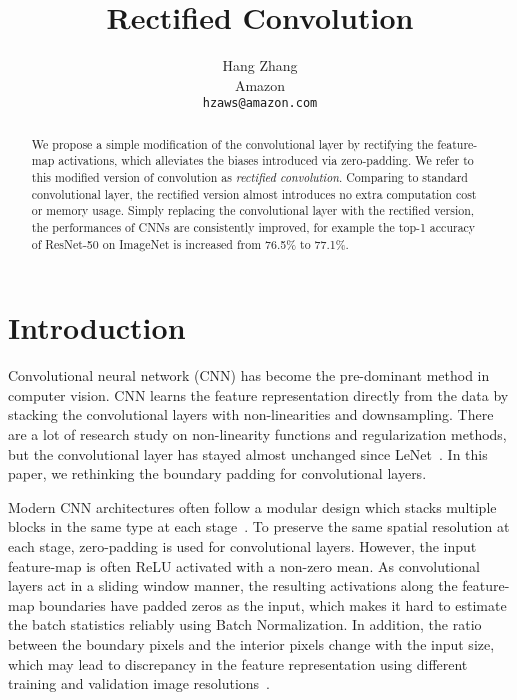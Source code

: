 \documentclass{article}
\title{Rectified Convolution}
\author{%
  Hang Zhang \\
  Amazon \\
  \texttt{hzaws@amazon.com} \\
}
\begin{document}
\maketitle

\begin{abstract}
  
  We propose a simple modification of the convolutional layer by rectifying the feature-map activations, which alleviates the biases introduced via zero-padding. We refer to this modified version of convolution as {\em rectified convolution}. 
  Comparing to standard convolutional layer, the rectified version almost introduces no extra computation cost or memory usage. 
  Simply replacing the convolutional layer with the rectified version, the performances of CNNs are consistently improved, for example the top-1 accuracy of ResNet-50 on ImageNet is increased from 76.5\% to 77.1\%. %
  
  
\end{abstract}

\section{Introduction}


Convolutional neural network (CNN) has become the pre-dominant method in computer vision. 
CNN learns the feature representation directly from the data by stacking the convolutional layers with non-linearities and downsampling. 
There are a lot of research study on non-linearity functions and regularization methods, but the convolutional layer has stayed almost unchanged since LeNet~\cite{lecun1998gradient}. In this paper, we rethinking the boundary padding for convolutional layers. %


Modern CNN architectures often follow a modular design which stacks multiple blocks in the same type at each stage~\cite{simonyan2014very,he2015deep}. 
To preserve the same spatial resolution at each stage, zero-padding is used for convolutional layers. 
However, the input feature-map is often ReLU activated with a non-zero mean. 
As convolutional layers act in a sliding window manner, the resulting activations along the feature-map boundaries have padded zeros as the input, which makes it hard to estimate the batch statistics reliably using Batch Normalization. 
In addition, the ratio between the boundary pixels and the interior pixels change with the input size, which may lead to discrepancy in the feature representation using different training and validation image resolutions~\cite{touvron2019fixing}. 
\end{document}
